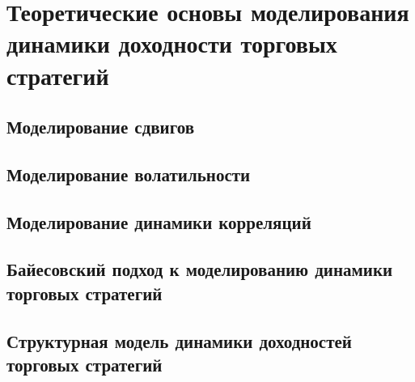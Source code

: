 \chapter{Теоретические основы моделирования динамики доходности торговых стратегий}
\section{Моделирование сдвигов}

\section{Моделирование волатильности}
\section{Моделирование динамики корреляций}
\section{Байесовский подход к моделированию динамики торговых стратегий}
\section{Структурная модель динамики доходностей торговых стратегий}



